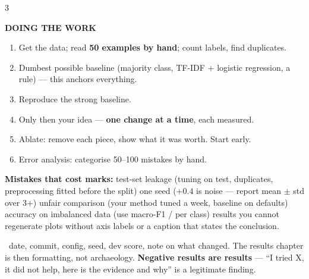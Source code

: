\documentclass[10pt,a4paper]{article}
\newcommand{\head}[1]{%
  \vspace{4.5pt}{\color{brand}\rule{\linewidth}{0.9pt}}\par\vspace{1.5pt}%
  {\bfseries\color{brand}\MakeUppercase{#1}}\par\vspace{2pt}}
\newcommand{\sub}[1]{\par\addvspace{2.6pt}\noindent{\bfseries\color{ink}#1}\ \ignorespaces}
\newcommand{\dt}{\,\textperiodcentered\,\allowbreak}
\newenvironment{flag}
 {\par\addvspace{2pt}\setlength{\FrameSep}{3pt}%
  \def\FrameCommand{{\color{accent}\vrule width 1.4pt}\hspace{4pt}}%
  \MakeFramed{\advance\hsize-\width \FrameRestore}\parindent=0pt\ignorespaces}
 {\par\endMakeFramed\addvspace{2pt}}
\begin{document}
\begin{multicols}{3}
\columnbreak
\head{Doing the work}
\begin{enumerate}
  \item Get the data; read \textbf{50 examples by hand}; count labels, find
        duplicates.
  \item Dumbest possible baseline (majority class, TF-IDF + logistic
        regression, a rule) --- this anchors everything.
  \item Reproduce the strong baseline.
  \item Only then your idea --- \textbf{one change at a time}, each measured.
  \item Ablate: remove each piece, show what it was worth. Start early.
  \item Error analysis: categorise 50--100 mistakes by hand.
\end{enumerate}
\begin{flag}
\textbf{Mistakes that cost marks:} test-set leakage (tuning on test,
duplicates, preprocessing fitted before the split)\dt one seed ($+0.4$ is
noise --- report mean $\pm$ std over 3+)\dt unfair comparison (your method
tuned a week, baseline on defaults)\dt accuracy on imbalanced data (use
macro-F1 / per class)\dt results you cannot regenerate\dt plots without axis
labels or a caption that states the conclusion.
\end{flag}
\sub{Results table from day one}date, commit, config, seed, dev score, note on
what changed. The results chapter is then formatting, not archaeology.
\textbf{Negative results are results} --- ``I tried X, it did not help, here is
the evidence and why'' is a legitimate finding.


\end{multicols}
\end{document}
